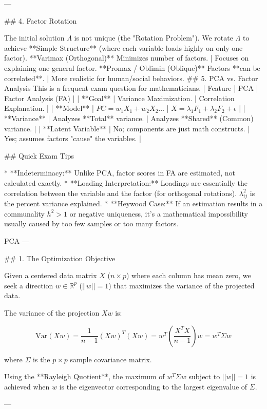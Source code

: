 ---

## 4. Factor Rotation

The initial solution \( \Lambda \) is not unique (the "Rotation Problem"). We rotate \( \Lambda \) to achieve **Simple Structure** (where each variable loads highly on only one factor).
 **Varimax (Orthogonal)** Minimizes number of factors. | Focuses on explaining one general factor.
 **Promax / Oblimin (Oblique)** Factors **can be correlated**. | More realistic for human/social behaviors.
## 5. PCA vs. Factor Analysis
This is a frequent exam question for mathematicians.
| Feature | PCA | Factor Analysis (FA) |
| **Goal** | Variance Maximization. | Correlation Explanation. |
| **Model** | \( PC = w_1X_1 + w_2X_2 \dots \) | \( X = \lambda_1F_1 + \lambda_2F_2 + \epsilon \) |
| **Variance** | Analyzes **Total** variance. | Analyzes **Shared** (Common) variance. |
| **Latent Variable** | No; components are just math constructs. | Yes; assumes factors "cause" the variables. |

## Quick Exam Tips

* **Indeterminacy:** Unlike PCA, factor scores in FA are estimated, not calculated exactly.
* **Loading Interpretation:** Loadings are essentially the correlation between the variable and the factor (for orthogonal rotations). 
\( \lambda_{ij}^2 \) is the percent variance explained.
* **Heywood Case:** If an estimation results in a communality \( h^2 > 1 \) or negative uniqueness, it's a mathematical impossibility usually caused by too few samples or too many factors.



PCA
---

## 1. The Optimization Objective

Given a centered data matrix \( X \) (\( n \times p \)) where each column has mean zero, we seek a direction \( w \in \mathbb{R}^p \) (\( ||w|| = 1 \)) that maximizes the variance of the projected data.

The variance of the projection \( Xw \) is:


\[ \text{Var}(Xw) = \frac{1}{n-1} (Xw)^T(Xw) = w^T \left( \frac{X^T X}{n-1} \right) w = w^T \Sigma w \]


where \( \Sigma \) is the \( p \times p \) sample covariance matrix.

Using the **Rayleigh Quotient**, the maximum of \( w^T \Sigma w \) subject to \( ||w|| = 1 \) is achieved when \( w \) is the eigenvector corresponding to the largest eigenvalue of \( \Sigma \).

---

